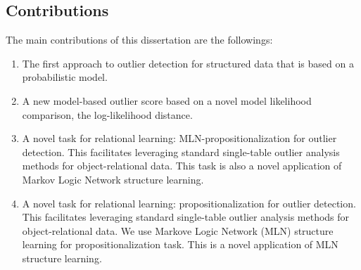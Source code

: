 %	 
%	 

\subsection{Contributions}
The main contributions of this dissertation are the followings:
\begin{enumerate} 
	\item The first approach to outlier detection for structured data that is based on a probabilistic model. 
	\item A new model-based outlier score based on a novel model likelihood comparison, the log-likelihood distance.  %
	\item A novel task for relational learning: MLN-propositionalization for outlier detection. This facilitates leveraging standard single-table outlier analysis methods for object-relational data.  This task is also a novel application of Markov Logic Network structure learning.
	\item  A novel task for relational learning: propositionalization for outlier detection. This facilitates leveraging standard single-table outlier analysis methods for object-relational data. We use Markove Logic Network (MLN) structure learning for propositionalization task. This is a novel application of MLN structure learning.
	
\end{enumerate}
